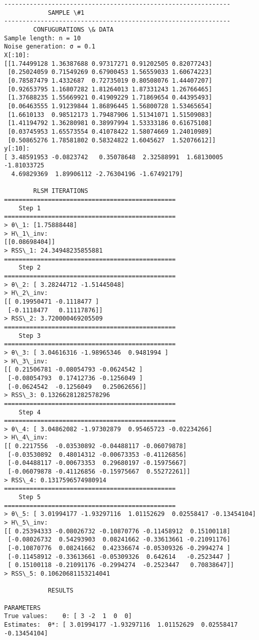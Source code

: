 \documentclass[11pt]{article}
\begin{document}
    \begin{Verbatim}[commandchars=\\\{\}]
--------------------------------------------------------------
			SAMPLE \#1
--------------------------------------------------------------
		CONFUGURATIONS \& DATA
Sample length: n = 10
Noise generation: σ = 0.1
X[:10]:
[[1.74499128 1.36387688 0.97317271 0.91202505 0.82077243]
 [0.25024059 0.71549269 0.67900453 1.56559033 1.60674223]
 [0.78587479 1.4332687  0.72735019 0.80508076 1.44407207]
 [0.92653795 1.16807282 1.81264013 1.87331243 1.26766465]
 [1.37688235 1.55669921 0.41909229 1.71869654 0.44395493]
 [0.06463555 1.91239844 1.86896445 1.56800728 1.53465654]
 [1.6610133  0.98512173 1.79487906 1.51341071 1.51509083]
 [1.41194792 1.36280981 0.38997994 1.53333186 0.61675108]
 [0.03745953 1.65573554 0.41078422 1.58074669 1.24010989]
 [0.50865276 1.78581802 0.58324822 1.6045627  1.52076612]]
y[:10]:
[ 3.48591953 -0.0823742   0.35078648  2.32588991  1.68130005 -1.81033725
  4.69829369  1.89906112 -2.76304196 -1.67492179]

		RLSM ITERATIONS
===============================================
	Step 1
===============================================
> θ\_1: [1.75888448]
> H\_1\_inv:
[[0.08698404]]
> RSS\_1: 24.34948235855881
===============================================
	Step 2
===============================================
> θ\_2: [ 3.28244712 -1.51445048]
> H\_2\_inv:
[[ 0.19950471 -0.1118477 ]
 [-0.1118477   0.11117876]]
> RSS\_2: 3.720000469205509
===============================================
	Step 3
===============================================
> θ\_3: [ 3.04616316 -1.98965346  0.9481994 ]
> H\_3\_inv:
[[ 0.21506781 -0.08054793 -0.0624542 ]
 [-0.08054793  0.17412736 -0.1256049 ]
 [-0.0624542  -0.1256049   0.25062656]]
> RSS\_3: 0.13266281282578296
===============================================
	Step 4
===============================================
> θ\_4: [ 3.04862082 -1.97302879  0.95465723 -0.02234266]
> H\_4\_inv:
[[ 0.2217556  -0.03530892 -0.04488117 -0.06079878]
 [-0.03530892  0.48014312 -0.00673353 -0.41126856]
 [-0.04488117 -0.00673353  0.29680197 -0.15975667]
 [-0.06079878 -0.41126856 -0.15975667  0.55272261]]
> RSS\_4: 0.1317596574980914
===============================================
	Step 5
===============================================
> θ\_5: [ 3.01994177 -1.93297116  1.01152629  0.02558417 -0.13454104]
> H\_5\_inv:
[[ 0.25394333 -0.08026732 -0.10870776 -0.11458912  0.15100118]
 [-0.08026732  0.54293903  0.08241662 -0.33613661 -0.21091176]
 [-0.10870776  0.08241662  0.42336674 -0.05309326 -0.2994274 ]
 [-0.11458912 -0.33613661 -0.05309326  0.642614   -0.2523447 ]
 [ 0.15100118 -0.21091176 -0.2994274  -0.2523447   0.70838647]]
> RSS\_5: 0.10620681153214041

			RESULTS

PARAMETERS
True values:	θ: [ 3 -2  1  0  0]
Estimates:	θ*: [ 3.01994177 -1.93297116  1.01152629  0.02558417 -0.13454104]

    \end{Verbatim}
\end{document}
